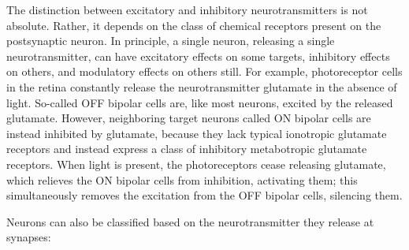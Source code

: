 \documentclass[]{book}
\begin{document}
The distinction between excitatory and inhibitory neurotransmitters is not absolute. Rather, it depends on the class of chemical receptors present on the postsynaptic neuron. In principle, a single neuron, releasing a single neurotransmitter, can have excitatory effects on some targets, inhibitory effects on others, and modulatory effects on others still. For example, photoreceptor cells in the retina constantly release the neurotransmitter glutamate in the absence of light. So-called OFF bipolar cells are, like most neurons, excited by the released glutamate. However, neighboring target neurons called ON bipolar cells are instead inhibited by glutamate, because they lack typical ionotropic glutamate receptors and instead express a class of inhibitory metabotropic glutamate receptors. When light is present, the photoreceptors cease releasing glutamate, which relieves the ON bipolar cells from inhibition, activating them; this simultaneously removes the excitation from the OFF bipolar cells, silencing them.

Neurons can also be classified based on the neurotransmitter they release at synapses:
\end{document}
